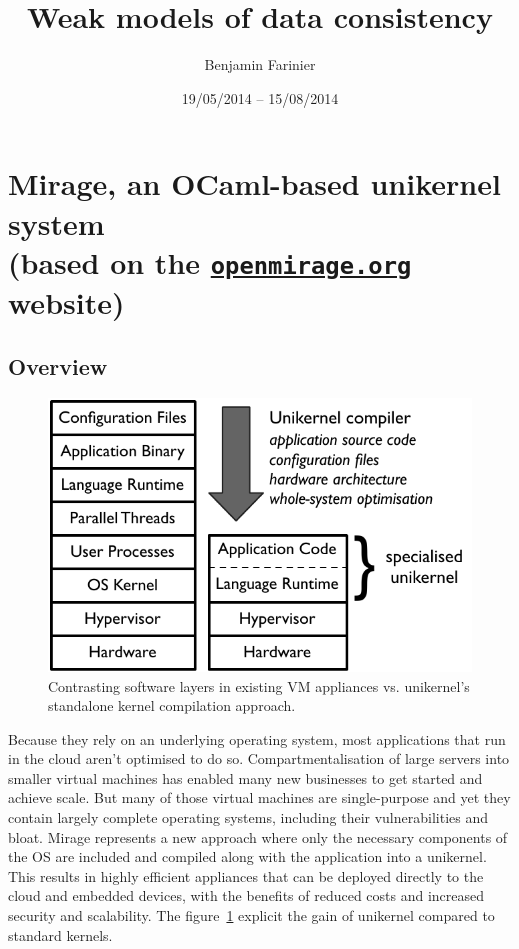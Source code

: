 \documentclass{article}
\title{Weak models of data consistency}
\author{Benjamin Farinier}
\date{19/05/2014 -- 15/08/2014}
\renewcommand{\-}{\hyp}
\newcommand{\mirage}{Mirage\xspace}
\newcommand{\ocaml}{OCaml\xspace}
\begin{document}
\maketitle
\tableofcontents

\section[\mirage, an \ocaml-based unikernel system]{\mirage, an \ocaml-based unikernel system\\\normalsize\normalfont(based on the \href{http://openmirage.org}{\texttt{openmirage.org}} website)}

\subsection{Overview}

\begin{figure}[hbt]
\centering
\includegraphics[scale=0.8]{mirage-stack.pdf}
\caption{Contrasting software layers in existing VM appliances vs.
unikernel’s standalone kernel compilation approach.}
\label{mirage-stack}
\end{figure}

Because they rely on an underlying operating system, most applications that run in the cloud aren't optimised to do so.
Compartmentalisation of large servers into smaller virtual machines has enabled many new businesses to get started and achieve scale.
But many of those virtual machines are single-purpose and yet they contain largely complete operating systems, including their vulnerabilities and bloat.
\mirage represents a new approach where only the necessary components of the OS are included and compiled along with the application into a unikernel.
This results in highly efficient appliances that can be deployed directly to the cloud and embedded devices, with the benefits of reduced costs and increased security and scalability. The figure~\ref{mirage-stack} explicit the gain of unikernel compared to standard kernels.
\end{document}
